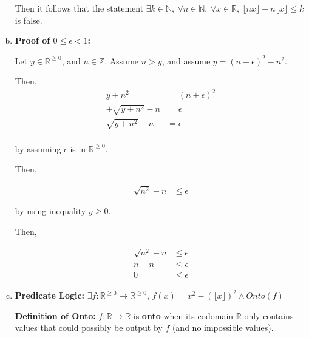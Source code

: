 \documentclass[12pt]{article}
\begin{document}
\begin{enumerate}[a.]
    \bigskip

    Then it follows that the statement $\exists k \in \mathbb{N},\:\forall n \in \mathbb{N},\:
    \forall x \in \mathbb{R},\: \lfloor nx \rfloor - n \lfloor x \rfloor \leq k$ is false.

    \item

    \textbf{Proof of $0 \leq \epsilon < 1$:}

    \bigskip

    Let $y \in \mathbb{R}^{\geq 0}$, and $n \in \mathbb{Z}$. Assume $n >y$, and
    assume $y = (n + \epsilon)^2 - n^2$.

    \bigskip

    Then,
    \setcounter{equation}{0}
    \begin{align}
        y + n^2 &= (n + \epsilon)^2\\
        \pm \sqrt{y + n^2} - n &= \epsilon\\
        \sqrt{y + n^2} - n &= \epsilon\\
    \end{align}

    by assuming $\epsilon$ is in $\mathbb{R}^{\geq 0}$.

    \bigskip

    Then,

    \begin{align}
        \sqrt{n^2} - n &\leq \epsilon
    \end{align}

    by using inequality $y \geq 0$.

    \bigskip

    Then,

    \begin{align}
        \sqrt{n^2} - n &\leq \epsilon\\
        n - n &\leq \epsilon\\
        0 &\leq \epsilon
    \end{align}

    \item

    \textbf{Predicate Logic:} $\exists f:\mathbb{R}^{\geq 0} \to \mathbb{R}^{\geq 0}$,
    $f(x) = x^2 - (\lfloor x \rfloor)^2 \land Onto(f)$

    \textbf{Definition of Onto:} $f:\mathbb{R} \to \mathbb{R}$ is \textbf{onto}
    when its codomain $\mathbb{R}$ only contains values that could possibly be output
    by $f$ (and no impossible values).

    \bigskip


\end{enumerate}
\end{document}
